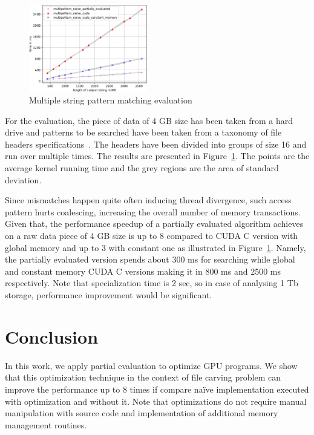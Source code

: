 \documentclass[sigplan]{acmart}\settopmatter{printacmref=false, printfolios=false}
\begin{document}

\begin{figure}[t]
  \centering
  \includegraphics[width=0.46\textwidth]{results.pdf}
  \caption{Multiple string pattern matching evaluation}
  \label{fig:eval}
\end{figure}

For the evaluation, the piece of data of 4 GB size has been taken from a hard drive and patterns to be searched have been taken from a taxonomy of file headers specifications~\cite{Headers}.
The headers have been divided into groups of size 16 and run over multiple times.
The results are presented in Figure~\ref{fig:eval}.
The points are the average kernel running time and the grey regions are the area of standard deviation.

Since mismatches happen quite often inducing thread divergence, such access pattern hurts coalescing, increasing the overall number of memory transactions.
Given that, the performance speedup of a partially evaluated algorithm achieves on a raw data piece of 4 GB size is up to $8$ compared to CUDA C version with global memory and up to $3$ with constant one as illustrated in Figure~\ref{fig:eval}. Namely, the partially evaluated version spends about 300 ms for searching while global and constant memory CUDA C versions making it in 800 ms and 2500 ms respectively.
Note that specialization time is 2 sec, so in case of analysing 1 Tb storage, performance improvement would be significant.


\section{Conclusion}
In this work, we apply partial evaluation to optimize GPU programs.
We show that this optimization technique in the context of file carving problem can improve the performance up to $8$ times if compare na\"ive implementation executed with optimization and without it.
Note that optimizations do not require manual manipulation with source code and implementation of additional memory management routines.
\end{document}

